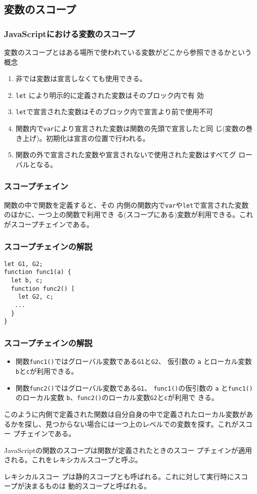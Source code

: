 \subsection{変数のスコープ}
\begin{frame}[containsverbatim]
\frametitle{JavaScriptにおける変数のスコープ}
変数のスコープとはある場所で使われている変数がどこから参照できるかという
概念
\begin{enumerate}
 \item 非\Strict では変数は宣言しなくても使用できる。\label{3-4NoDeclare}
 \item \Verb+let+ により明示的に定義された変数はそのブロック内で有
       効\label{3-4DeclareInFunc}
 \item \Verb+let+で宣言された変数はそのブロック内で宣言より前で使用不可
       \label{3-4DeclareInFunc2}
 \item 関数内で\Verb+var+により宣言された変数は関数の先頭で宣言したと同
       じ(変数の巻き上げ)。初期化は宣言の位置で行われる。
 \item 関数の外で宣言された変数や宣言されないで使用された変数はすべてグ
       ローバルとなる。\label{3-4Declare2}
\end{enumerate}
\end{frame}
\begin{frame}[containsverbatim]
\frametitle{スコープチェイン}
関数の中で関数を定義すると、その
内側の関数内で\Verb+var+や\Verb+let+で宣言された変数のほかに、一つ上の関数で利用でき
る(スコープにある)変数が利用できる。これがスコープチェインである。
\end{frame}
\begin{frame}[containsverbatim]
\frametitle{スコープチェインの解説}
\begin{Verbatim}
let G1, G2;
function func1(a) {
  let b, c;
  function func2() [
    let G2, c;
   ...
  }
}
\end{Verbatim}
\end{frame}
\begin{frame}[containsverbatim]
\frametitle{スコープチェインの解説}
\begin{itemize}
 \item 関数\Verb+func1()+ではグローバル変数である\Verb+G1+と\Verb+G2+、
       仮引数の \Verb+a+ とローカル変数\Verb+b+と\Verb+c+が利用できる。
 \item 関数\Verb+func2()+ではグローバル変数である\Verb+G1+、
       \Verb+func1()+の仮引数の \Verb+a+ と\Verb+func1()+のローカル変数
       \Verb+b+、\Verb+func2()+のローカル変数\Verb+G2+と\Verb+c+が利用で
       きる。
\end{itemize}
このように内側で定義された関数は自分自身の中で定義されたローカル変数があ
るかを探し、見つからない場合には一つ上のレベルでの変数を探す。これがスコー
プチェインである。

JavaScriptの関数のスコープは関数が定義されたときのスコー
プチェインが適用される。これをレキシカルスコープと呼ぶ。

レキシカルスコー
プは静的スコープとも呼ばれる。これに対して実行時にスコープが決まるものは
動的スコープと呼ばれる。
\end{frame}
